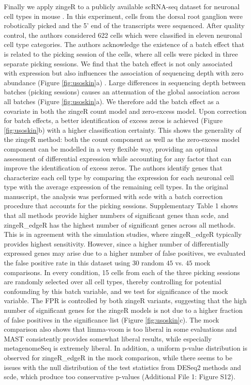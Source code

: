 \documentclass{bmcart}
\begin{document}
Finally we apply zingeR to a publicly available scRNA-seq dataset for neuronal cell types in mouse \cite{Usoskin2014}.
In this experiment, cells from the dorsal root ganglion were robotically picked and the 5' end of the transcripts were sequenced.
After quality control, the authors considered 622 cells which were classified in eleven neuronal cell type categories.
The authors acknowledge the existence of a batch effect that is related to the picking session of the cells, where all cells were picked in three separate picking sessions.
We find that the batch effect is not only associated with expression but also influences the association of sequencing depth with zero abundance (Figure \ref{fig:usoskin}a) \cite{Hicks2015}.
Large differences in sequencing depth between batches (picking sessions) causes an attenuation of the global association across all batches (Figure \ref{fig:usoskin}a).
We therefore add the batch effect as a covariate in both the zingeR count model and zero-excess model.
Upon correction for batch effects, a better identification of excess zeros is achieved (Figure \ref{fig:usoskin}b) with a higher classification certainty.
This shows the generality of the zingeR method: both the count component as well as the zero-excess model component can be modelled in a very flexible way, providing an optimal assessment of differential expression while accounting for any factor that can improve the identification of excess zeros.
The authors identify genes that characterize each cell type by comparing the expression for each neuronal cell type with the average expression of the remaining cell types.
In the original manuscript, the analysis was performed with scde \cite{Kharchenko2014} with a batch correction procedure that accounts for the picking sessions.
Supplementary Table 1 shows that all methods provide higher numbers of significant genes than scde, and zingeR\_edgeR has the highest number of significant genes across all methods.
This is in agreement with the simulation studies, where zingeR\_edgeR typically provides highest sensitivity.
However, since a higher number of differentially expressed genes may arise due to a higher number of false positives, we evaluated the false positive rate in this dataset using $30$ random $45$ vs. $45$ mock comparisons.
In every condition, 15 cells from each of the three picking sessions are randomly selected over all cell types, thereby controlling for potential confounding by this batch variable, and we test for significance of the mock variable.
The FPR is controlled by both zingeR variants, suggesting that the high number of significant genes for the zingeR models is not due to a higher fraction of false positives in the significance list (Figure \ref{fig:usoskin}c).
The mock comparison also shows that limma-voom is too liberal in some evaluations and MAST consistently provides somewhat liberal results, while especially metagenomeSeq is extremely liberal.
In addition, a uniform p-value distribution is observed for zingeR\_edgeR in the mock comparison, while there seems to be issues with the null distribution of the test statistics from DESeq2 methods and scde, which produce too conservative p-values (Additional File 1: Figure S12).
\end{document}
